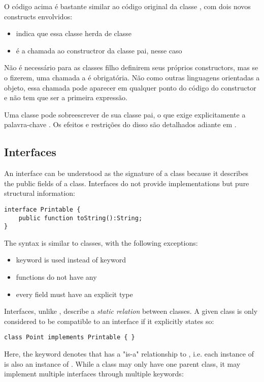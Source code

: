 {O código acima é bastante similar ao código original da classe , com dois novos constructs envolvidos:
\begin{itemize}
 \item {} indica que essa classe herda de classe 
 \item {} é a chamada ao constructror da classe pai, nesse caso 
\end{itemize}
Não é necessário para as classes filho definirem seus próprios constructors, mas se o fizerem, uma chamada a  é obrigatória. Não como outras linguagens orientadas a objeto, essa chamada pode aparecer em qualquer ponto do código do constructor e não tem que ser a primeira expressão.

Uma classe pode sobreescrever  de sua classe pai, o que exige explicitamente a palavra-chave . Os efeitos e restrições do disso são detalhados adiante em  .


\subsection{Interfaces}
\label{types-interfaces}

An interface can be understood as the signature of a class because it describes the public fields of a class. Interfaces do not provide implementations but pure structural information:

\begin{lstlisting}
interface Printable {
	public function toString():String;
}
\end{lstlisting}
The syntax is similar to classes, with the following exceptions:

\begin{itemize}
	\item {} keyword is used instead of  keyword
	\item functions do not have any 
	\item every field must have an explicit type
\end{itemize}
Interfaces, unlike , describe a \emph{static relation} between classes. A given class is only considered to be compatible to an interface if it explicitly states so:

\begin{lstlisting}
class Point implements Printable { }
\end{lstlisting}
Here, the  keyword denotes that  has a "is-a" relationship to , i.e. each instance of  is also an instance of . While a class may only have one parent class, it may implement multiple interfaces through multiple  keywords:

}

